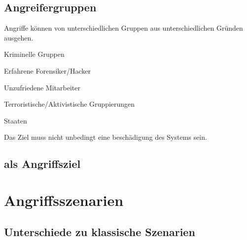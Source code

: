 \documentclass[final,bibliography=totocnumbered]{include/sikseminar}
\begin{document}

\subsection{Angreifergruppen}\label{subsec:angreifergruppen}

Angriffe können von unterschiedlichen Gruppen aus unterschiedlichen Gründen ausgehen.

\begin{compactenum}[(1)]
    \item Kriminelle Gruppen \cite{CAS+09,WYX+10}
    \item Erfahrene Forensiker/Hacker \cite{WYX+10}
    \item Unzufriedene Mitarbeiter \cite{CAS+09,WYX+10}
    \item Terroristische/Aktivistische Gruppierungen \cite{CAS+09,WYX+10}
    \item Staaten \cite{CAS+09}
\end{compactenum}

Das Ziel muss nicht unbedingt eine beschädigung des Systems sein.

\subsection{ als Angriffsziel}\label{subsec:angriffsziel}

\section{Angriffsszenarien}\label{sec:angriffszenarien}
\subsection{Unterschiede zu klassische Szenarien}\label{subsec:klassisch}
\end{document}
